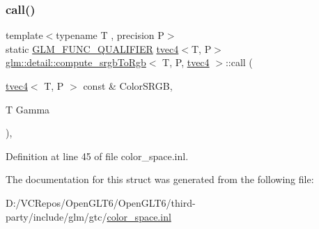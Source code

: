 \subsubsection{\texorpdfstring{call()}{call()}}
{\footnotesize\ttfamily template$<$typename T , precision P$>$ \\
static \mbox{\hyperlink{setup_8hpp_a33fdea6f91c5f834105f7415e2a64407}{G\+L\+M\+\_\+\+F\+U\+N\+C\+\_\+\+Q\+U\+A\+L\+I\+F\+I\+ER}} \mbox{\hyperlink{structglm_1_1tvec4}{tvec4}}$<$T, P$>$ \mbox{\hyperlink{structglm_1_1detail_1_1compute__srgb_to_rgb}{glm\+::detail\+::compute\+\_\+srgb\+To\+Rgb}}$<$ T, P, \mbox{\hyperlink{structglm_1_1tvec4}{tvec4}} $>$\+::call (\begin{DoxyParamCaption}\item[{\mbox{\hyperlink{structglm_1_1tvec4}{tvec4}}$<$ T, P $>$ const \&}]{Color\+S\+R\+GB,  }\item[{T}]{Gamma }\end{DoxyParamCaption})\hspace{0.3cm}{\ttfamily [inline]}, {\ttfamily [static]}}



Definition at line 45 of file color\+\_\+space.\+inl.



The documentation for this struct was generated from the following file\+:\begin{DoxyCompactItemize}
\item 
D\+:/\+V\+C\+Repos/\+Open\+G\+L\+T6/\+Open\+G\+L\+T6/third-\/party/include/glm/gtc/\mbox{\hyperlink{gtc_2color__space_8inl}{color\+\_\+space.\+inl}}\end{DoxyCompactItemize}
